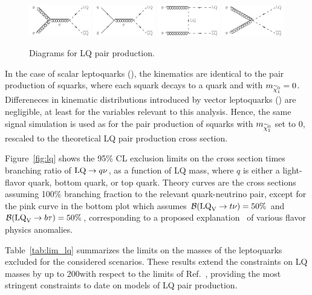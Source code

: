 \begin{figure}[htbp]
  \centering
    \includegraphics[width=0.24\textwidth]{figs/results/LQdiagram_a.pdf}
    \includegraphics[width=0.24\textwidth]{figs/results/LQdiagram_b.pdf}
    \includegraphics[width=0.24\textwidth]{figs/results/LQdiagram_c.pdf}
    \includegraphics[width=0.24\textwidth]{figs/results/LQdiagram_d.pdf}
    \vspace{3mm}
    \caption{Diagrams for LQ pair production.}
    \label{fig:SMS_LQ}
\end{figure}

In the case of scalar leptoquarks (\lqs), the kinematics are identical to the
pair production of squarks, where each squark decays to a quark and \lsp with $m_{\widetilde{\chi}_1^0}=0$.
Differeneces in kinematic distributions introduced by vector leptoquarks (\lqv) are negligible,
at least for the variables relevant to this analysis. Hence, the same signal simulation is
used as for the pair production of squarks with $m_{\widetilde{\chi}_1^0}$ set to 0, rescaled to the
theoretical LQ pair production cross section.

Figure~\ref{fig:lq} shows the 95\% CL exclusion limits on the cross section times branching ratio
of $\mathrm{LQ}\to q\nu$, as a function of LQ mass, where $q$ is either a light-flavor quark, bottom quark, or top
quark. Theory curves are the cross sections assuming 100\% branching fraction to the relevant quark-neutrino pair,
except for the pink curve in the bottom plot which assumes $\mathcal{B}(\text{LQ}_\text{V}\to t\nu)=50\%$ and
$\mathcal{B}(\text{LQ}_\text{V}\to b\tau)=50\%$, corresponding to a proposed explanation~\cite{Buttazzo:bphys} of various flavor
physics anomalies.

Table~\ref{tab:lim_lq} summarizes the limits on the masses of the leptoquarks excluded for the considered scenarios.
These results extend the constraints on LQ masses by up to 200\GeV with respect to the limits of Ref.~\cite{CMS:mt2LQ},
providing the most stringent constraints to date on models of LQ pair production.

